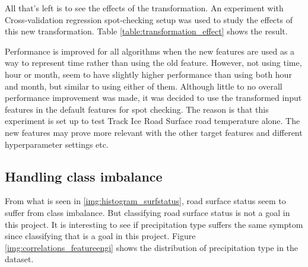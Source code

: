 	All that's left is to see the effects of the transformation. An experiment with Cross-validation regression spot-checking setup was used to study the effects of this new transformation. Table \ref{table:transformation_effect} shows the result.

	\begin{table}[H] %
	\centering
	\caption{Experiment to see the effects of transforming the time feature is relevant to use as input feature. }
	\end{table}

	Performance is improved for all algorithms when the new features are used as a way to represent time rather than using the old feature. However, not using time, hour or month, seem to have slightly higher performance than using both hour and month, but similar to using either of them. Although little to no overall performance improvement was made, it was decided to use the transformed input features in the default features for spot checking. The reason is that this experiment is set up to test Track Ice Road Surface road temperature alone. The new features may prove more relevant with the other target features and different hyperparameter settings etc.


\subsection{Handling class imbalance} \label{sec:class_imbalance}
	From what is seen in \ref{img:histogram_surfstatus}, road surface status seem to suffer from class imbalance. But classifying road surface status is not a goal in this project. It is interesting to see if precipitation type suffers the same symptom since classifying that is a goal in this project. Figure \ref{img:correlations_featureengi} shows the distribution of precipitation type in the dataset. 
	
